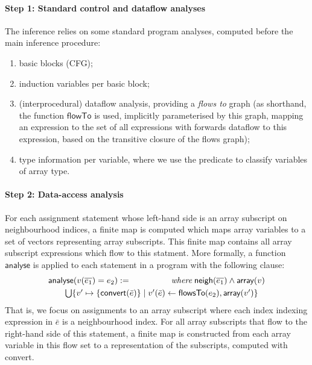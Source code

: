 \documentclass[9pt]{sigplanconf}
\newcounter{block}
\theoremstyle{definition}
\begin{document}
\paragraph{Step 1: Standard control and dataflow analyses}
The inference relies on some standard program analyses, computed
before the main inference procedure:
%
\begin{enumerate}
\item basic blocks (CFG);
\item induction variables per basic block;
\item (interprocedural) dataflow analysis, providing a \emph{flows to}
  graph (as shorthand, the function
  $\mathsf{flowTo}$ is used, implicitly parameterised by this graph,  
  mapping an expression to the set of all expressions
  with forwards dataflow to this expression, based on the transitive
  closure of the flows graph);
\item type information per variable, where we use the predicate
\arrayTy{} to classify variables of array type. 
\end{enumerate}
%

\paragraph{Step 2: Data-access analysis}

For each assignment statement whose left-hand side is an array
subscript on neighbourhood indices, a finite map is computed which
maps array variables to a set of vectors representing array
subscripts.  This finite map contains all array subscript expressions
which flow to this statment. More formally, a function
$\textsf{analyse}$ is applied to each statement in a program with the
following clause:
%
\begin{align*}
\begin{array}{lr}
\textsf{analyse}(v(\overline{e_1}) = e_2)
 := \qquad\qquad & \textit{where} \; \neigh(\overline{e_1}) \wedge \arrayTy(v)  \\[0.3em]
\multicolumn{2}{l}{\qquad \bigcup\{v' \mapsto \{\textsf{convert}(\bar{e})\} \mid v'(\bar{e}) \leftarrow \mathsf{flowsTo}(e_2),
  \arrayTy(v')\}}
\end{array}
\end{align*}
%
That is, we focus on assignments to an array subscript where each
index indexing expression in $\bar{e}$ is a neighbourhood index.  For
all array subscripts that flow to the right-hand side of this
statement, a finite map is constructed from each array variable
in this flow set to a representation of the subscripts, computed
with \textsf{convert}.
\end{document}
